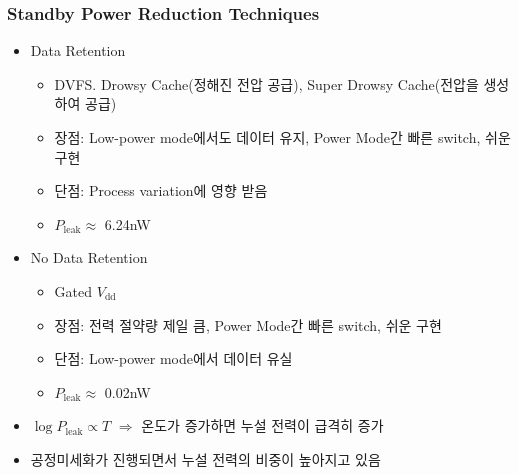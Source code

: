 \subsubsection*{Standby Power Reduction Techniques}
\begin{itemize}
    \item Data Retention
    \begin{itemize}
        \item DVFS. Drowsy Cache(정해진 전압 공급), Super Drowsy Cache(전압을 생성하여 공급)
        \item 장점: Low-power mode에서도 데이터 유지, Power Mode간 빠른 switch, 쉬운 구현
        \item 단점: Process variation에 영향 받음
        \item $P_{\mathrm{leak}} \approx$ 6.24nW
    \end{itemize}
    \item No Data Retention
    \begin{itemize}
        \item Gated $V_{\mathrm{dd}}$
        \item 장점: 전력 절약량 제일 큼, Power Mode간 빠른 switch, 쉬운 구현
        \item 단점: Low-power mode에서 데이터 유실
        \item $P_{\mathrm{leak}} \approx$ 0.02nW
    \end{itemize}
    \item $\log P_{\mathrm{leak}} \varpropto T$ $\Rightarrow$ 온도가 증가하면 누설 전력이 급격히 증가
    \item 공정미세화가 진행되면서 누설 전력의 비중이 높아지고 있음
\end{itemize}
